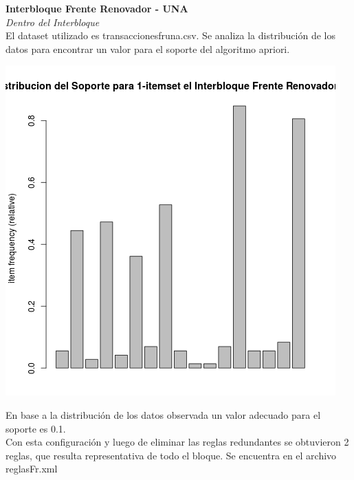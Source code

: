 \documentclass{endm}
\begin{document}
\newpage 

\textbf{Interbloque Frente Renovador - UNA}\\

\textit{Dentro del Interbloque} \\

El dataset utilizado es transaccionesfruna.csv. Se analiza la distribución de los datos para encontrar un valor para el soporte del algoritmo apriori. \\

\begin{center}
\includegraphics[scale=0.4]{graficos/soportesInterbloquesFrenteRenovador.png}
\end{center}

En base a la distribución de los datos observada un valor adecuado para el soporte es 0.1.\\

Con esta configuración y luego de eliminar las reglas redundantes se obtuvieron 2 reglas, que resulta representativa de todo el bloque. Se encuentra en el archivo reglasFr.xml  \\
\end{document}
